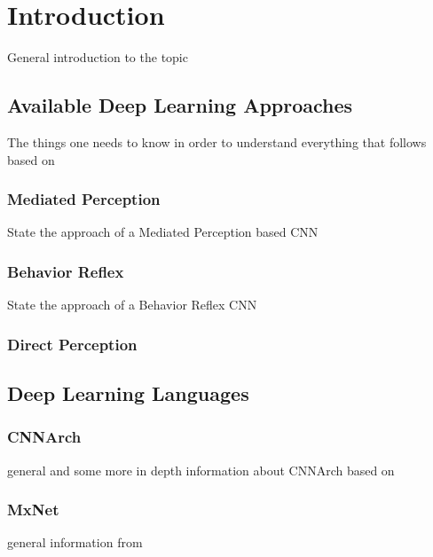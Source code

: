 \chapter{Introduction}

General introduction to the topic

\section{Available Deep Learning Approaches}

The things one needs to know in order to understand everything that follows based on \cite{chen2015deepdriving}

\subsection{Mediated Perception}

State the approach of a Mediated Perception based CNN

\subsection{Behavior Reflex}

State the approach of a Behavior Reflex CNN

\subsection{Direct Perception}

\section{Deep Learning Languages}

\subsection{CNNArch}

general and some more in depth information about CNNArch based on \cite{CNNArch}

\subsection{MxNet}

general information from \cite{chen2015mxnet}